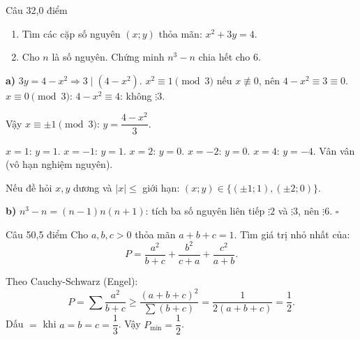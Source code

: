 \begin{de_cau}{Câu 3}{2,0 điểm}
\begin{enumerate}[label=\alph*)]
  \item Tìm các cặp số nguyên $(x;y)$ thỏa mãn: $x^2 + 3y = 4$.
  \item Cho $n$ là số nguyên. Chứng minh $n^3-n$ chia hết cho $6$.
\end{enumerate}
\end{de_cau}

\begin{loi_giai_cau}
\textbf{a)} $3y=4-x^2\Rightarrow 3\mid(4-x^2)$. $x^2\equiv1\pmod3$ nếu $x\not\equiv0$, nên $4-x^2\equiv3\equiv0$. $x\equiv0\pmod3$: $4-x^2\equiv4$: không $\vdots3$.

Vậy $x\equiv\pm1\pmod3$: $y=\dfrac{4-x^2}{3}$.

$x=1$: $y=1$. $x=-1$: $y=1$. $x=2$: $y=0$. $x=-2$: $y=0$. $x=4$: $y=-4$. Vân vân (vô hạn nghiệm nguyên).

Nếu đề hỏi $x,y$ dương và $|x|\le$ giới hạn: $(x;y)\in\{(\pm1;1),(\pm2;0)\}$.

\textbf{b)} $n^3-n=(n-1)n(n+1)$: tích ba số nguyên liên tiếp $\vdots2$ và $\vdots3$, nên $\vdots6$. $\square$
\end{loi_giai_cau}

\begin{de_cau}{Câu 5}{0,5 điểm}
Cho $a, b, c > 0$ thỏa mãn $a + b + c = 1$. Tìm giá trị nhỏ nhất của:
\[P = \dfrac{a^2}{b+c} + \dfrac{b^2}{c+a} + \dfrac{c^2}{a+b}.\]
\end{de_cau}

\begin{loi_giai_cau}
Theo Cauchy-Schwarz (Engel):
\[P=\sum\dfrac{a^2}{b+c}\ge\dfrac{(a+b+c)^2}{\sum(b+c)}=\dfrac{1}{2(a+b+c)}=\dfrac{1}{2}.\]
Dấu $=$ khi $a=b=c=\dfrac{1}{3}$. Vậy $P_{\min}=\boxed{\dfrac{1}{2}}$.
\end{loi_giai_cau}

